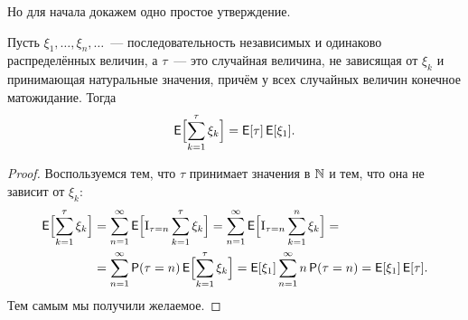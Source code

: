 Но для начала докажем одно простое утверждение.

\begin{theorem}
	Пусть \(\xi_{1}, \ldots, \xi_{n}, \ldots\)~--- последовательность независимых и одинаково 
	распределённых величин, а \(\tau\)~--- это случайная величина, не зависящая от \(\xi_{k}\) и принимающая натуральные значения, причём у всех случайных величин конечное матожидание. Тогда
	\[
		\E\Bigl[\sum_{k = 1}^{\tau} \xi_{k}\Bigr] = \E[\tau]\E[\xi_{1}].
	\]
\end{theorem}
\begin{proof}
	Воспользуемся тем, что \(\tau\) принимает значения в \(\mathbb{N}\) и тем, что она не зависит от 
	\(\xi_{k}\):
	\begin{align*}
		\E\Bigl[\sum_{k = 1}^{\tau} \xi_{k}\Bigr] 
		&= \sum_{n = 1}^{\infty}\E\Bigl[\I_{\tau = n}\sum_{k = 1}^{\tau} \xi_{k}\Bigr]
		= \sum_{n = 1}^{\infty}\E\Bigl[\I_{\tau = n}\sum_{k = 1}^{n} \xi_{k}\Bigr] = \\
		&= \sum_{n = 1}^{\infty}\Pr(\tau = n)\E\Bigl[\sum_{k = 1}^{\tau} \xi_{k}\Bigr]
		= \E[\xi_{1}]\sum_{n = 1}^{\infty} n\Pr(\tau = n) = \E[\xi_{1}]\E[\tau].
	\end{align*}
	Тем самым мы получили желаемое.
\end{proof}

